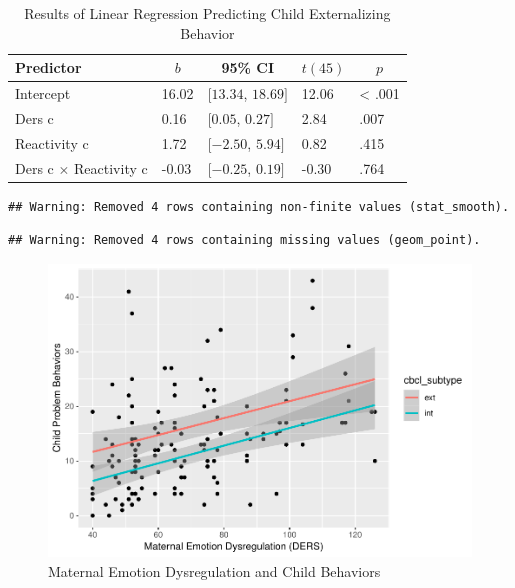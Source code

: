 \documentclass[man]{apa6}
\begin{document}
\begin{table}[tbp]
\begin{center}
\begin{threeparttable}
\caption{\label{tab:linear regression externalizing}Results of Linear Regression Predicting Child Externalizing Behavior}
\begin{tabular}{lllll}
\toprule
Predictor & \multicolumn{1}{c}{$b$} & \multicolumn{1}{c}{95\% CI} & \multicolumn{1}{c}{$t(45)$} & \multicolumn{1}{c}{$p$}\\
\midrule
Intercept & 16.02 & $[13.34$, $18.69]$ & 12.06 & < .001\\
Ders c & 0.16 & $[0.05$, $0.27]$ & 2.84 & .007\\
Reactivity c & 1.72 & $[-2.50$, $5.94]$ & 0.82 & .415\\
Ders c $\times$ Reactivity c & -0.03 & $[-0.25$, $0.19]$ & -0.30 & .764\\
\bottomrule
\end{tabular}
\end{threeparttable}
\end{center}
\end{table}

\begin{verbatim}
## Warning: Removed 4 rows containing non-finite values (stat_smooth).
\end{verbatim}

\begin{verbatim}
## Warning: Removed 4 rows containing missing values (geom_point).
\end{verbatim}

\begin{figure}
\centering
\includegraphics{DataPrepScript_apa_style_files/figure-latex/plot1-1.pdf}
\caption{\label{fig:plot1}Maternal Emotion Dysregulation and Child
Behaviors}
\end{figure}
\end{document}
